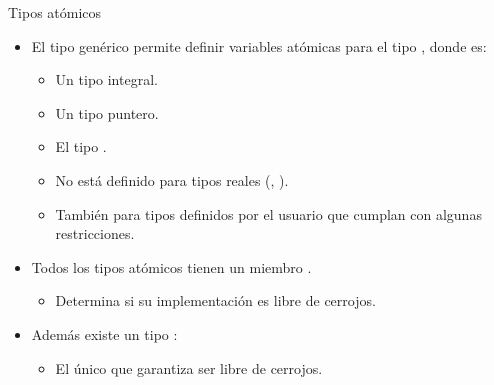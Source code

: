 \begin{frame}[t]{Tipos atómicos}
\begin{itemize}
  \item El tipo genérico  permite definir variables atómicas para el tipo , donde  es:
    \begin{itemize}
      \item Un tipo integral.
      \item Un tipo puntero.
      \item El tipo .
      \item No está definido para tipos reales (, ).
      \item También para tipos definidos por el usuario que cumplan con algunas restricciones.
    \end{itemize}
  \item Todos los tipos atómicos tienen un miembro .
    \begin{itemize}
      \item Determina si su implementación es libre de cerrojos.
    \end{itemize}
  \item Además existe un tipo :
    \begin{itemize}
      \item El único que garantiza ser libre de cerrojos.
    \end{itemize}
\end{itemize}
\end{frame}

